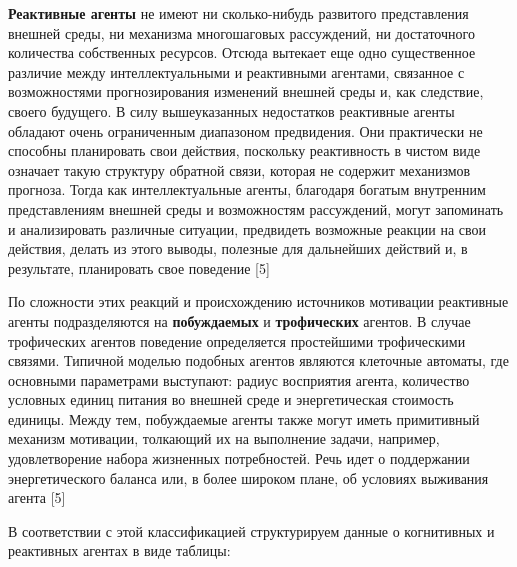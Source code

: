 \documentclass[14pt,a4paper,report]{report}
\begin{document}
\textbf{Реактивные агенты} не имеют ни сколько-нибудь развитого представления внешней среды, ни механизма многошаговых рассуждений, ни достаточного количества собственных ресурсов. Отсюда вытекает еще одно существенное различие между интеллектуальными и реактивными агентами, связанное с возможностями прогнозирования изменений внешней среды и, как следствие, своего будущего. В силу вышеуказанных недостатков реактивные агенты обладают очень ограниченным диапазоном предвидения. Они практически не способны планировать свои действия, поскольку реактивность в чистом виде означает такую структуру обратной связи, которая не содержит механизмов прогноза. Тогда как интеллектуальные агенты, благодаря богатым внутренним представлениям внешней среды и возможностям рассуждений, могут запоминать и анализировать различные ситуации, предвидеть возможные реакции на свои действия, делать из этого выводы, полезные для дальнейших действий и, в результате, планировать свое поведение [5]

По сложности этих реакций и происхождению источников мотивации реактивные агенты подразделяются на \textbf{побуждаемых} и \textbf{трофических} агентов. В случае трофических агентов поведение определяется простейшими трофическими связями. Типичной моделью подобных агентов являются клеточные автоматы, где основными параметрами выступают: радиус восприятия агента, количество условных единиц питания во внешней среде и энергетическая стоимость единицы. Между тем, побуждаемые агенты также могут иметь примитивный механизм мотивации, толкающий их на выполнение задачи, например, удовлетворение набора жизненных потребностей. Речь идет о поддержании энергетического баланса или, в более широком плане, об условиях выживания агента [5]

В соответствии с этой классификацией структурируем данные о когнитивных и реактивных агентах в виде таблицы:
\end{document}
